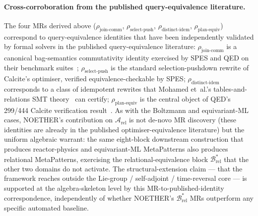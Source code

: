 \documentclass[acmsmall, screen]{acmart}
\begin{document}
\paragraph{Cross-corroboration from the published query-equivalence literature.}
The four MRs derived above ($\rho_{\mathrm{join\text{-}comm}}$, $\rho_{\mathrm{select\text{-}push}}$, $\rho_{\mathrm{distinct\text{-}idem}}$, $\rho_{\mathrm{plan\text{-}equiv}}$) correspond to query-equivalence identities that have been independently validated by formal solvers in the published query-equivalence literature: $\rho_{\mathrm{join\text{-}comm}}$ is a canonical bag-semantics commutativity identity exercised by SPES and QED on their benchmark suites~\cite{Wang2024QED, Zhou2022SPES}; $\rho_{\mathrm{select\text{-}push}}$ is the standard selection-pushdown rewrite of Calcite's optimiser, verified equivalence-checkable by SPES; $\rho_{\mathrm{distinct\text{-}idem}}$ corresponds to a class of idempotent rewrites that Mohamed et~al.'s tables-and-relations SMT theory~\cite{Mohamed2024SQLTables} can certify; $\rho_{\mathrm{plan\text{-}equiv}}$ is the central object of QED's 299/444 Calcite verification result~\cite{Wang2024QED}. As with the Boltzmann and equivariant-ML cases, NOETHER's contribution on $\mathcal{A}_{\mathrm{rel}}$ is not de-novo MR discovery (these identities are already in the published optimiser-equivalence literature) but the uniform algebraic warrant: the same eight-block downstream construction that produces reactor-physics and equivariant-ML MetaPatterns also produces relational MetaPatterns, exercising the relational-equivalence block $\mathcal{B}^{*}_{\mathrm{rel}}$ that the other two domains do not activate. The structural-extension claim --- that the framework reaches outside the Lie-group / self-adjoint / time-reversal core --- is supported at the algebra-skeleton level by this MR-to-published-identity correspondence, independently of whether NOETHER's $\mathcal{B}^{*}_{\mathrm{rel}}$ MRs outperform any specific automated baseline.
\end{document}
